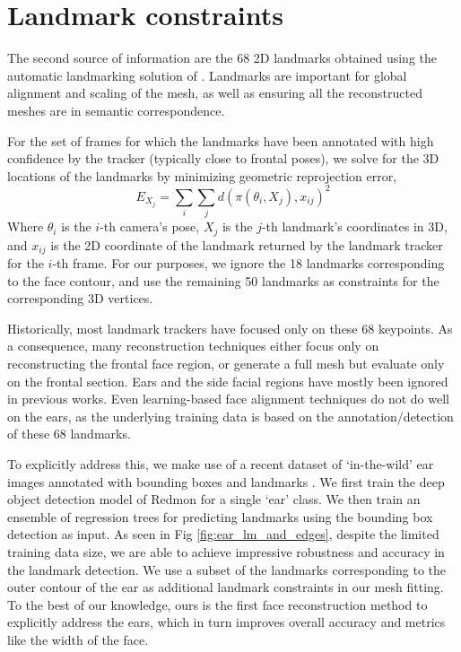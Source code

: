  
 \section{Landmark constraints}

 The second source of information are the 68 2D landmarks obtained using the automatic landmarking solution of \cite{baltrusaitis2018openface}. Landmarks are important for global alignment and scaling of the mesh, as well as ensuring all the reconstructed meshes are in semantic correspondence.
 
 For the set of frames for which the landmarks have been annotated with high confidence by the tracker (typically close to frontal poses), we solve for the 3D locations of the landmarks by minimizing geometric reprojection error, 
 \begin{equation}
    E_{X_{j}} = \sum_{i} \sum_{j} d(\pi (\theta_{i},X_{j}),x_{ij})^2
\end{equation}
Where $\theta_i$ is the $i$-th camera's pose, $X_{j}$ is the $j$-th landmark's coordinates in 3D, and $x_{ij}$ is the 2D coordinate of the landmark returned by the landmark tracker for the $i$-th frame. For our purposes, we ignore the 18 landmarks corresponding to the face contour, and use the remaining 50 landmarks as constraints for the corresponding 3D vertices.

Historically, most landmark trackers have focused only on these 68 keypoints. As a consequence, many reconstruction techniques either focus only on reconstructing the frontal face region, or generate a full mesh but evaluate only on the frontal section. Ears and the side facial regions have mostly been ignored in previous works. Even learning-based face alignment techniques do not do well on the ears, as the underlying training data is based on the annotation/detection of these 68 landmarks.

To explicitly address this, we make use of a recent dataset of `in-the-wild' ear images annotated with bounding boxes and landmarks \cite{zhou2017deformable}. We first train the deep object detection model of Redmon \etal \cite{redmon2017yolo9000} for a single `ear' class. We then train an ensemble of regression trees \cite{kazemi2014one} for predicting landmarks using the bounding box detection as input. As seen in Fig \ref{fig:ear_lm_and_edges}, despite the limited training data size, we are able to achieve impressive robustness and accuracy in the landmark detection. We use a subset of the landmarks corresponding to the outer contour of the ear as additional landmark constraints in our mesh fitting. To the best of our knowledge, ours is the first face reconstruction method to explicitly address the ears, which in turn improves overall accuracy and metrics like the width of the face.

